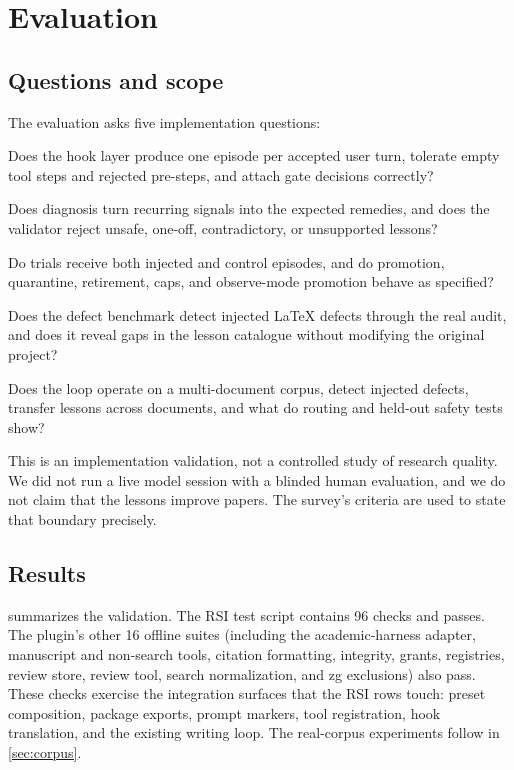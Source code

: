\section{Evaluation}
\label{sec:evaluation}

\subsection{Questions and scope}
\label{sec:questions}
The evaluation asks five implementation questions:
\begin{description}[leftmargin=1.5em,itemsep=2pt]
  \item[RQ1 (capture).] Does the hook layer produce one episode per accepted user turn, tolerate empty tool steps and rejected pre-steps, and attach gate decisions correctly?
  \item[RQ2 (diagnosis and safety).] Does diagnosis turn recurring signals into the expected remedies, and does the validator reject unsafe, one-off, contradictory, or unsupported lessons?
  \item[RQ3 (lifecycle).] Do trials receive both injected and control episodes, and do promotion, quarantine, retirement, caps, and observe-mode promotion behave as specified?
  \item[RQ4 (oracle integration).] Does the defect benchmark detect injected \LaTeX{} defects through the real audit, and does it reveal gaps in the lesson catalogue without modifying the original project?
  \item[RQ5 (real corpus).] Does the loop operate on a multi-document corpus, detect injected defects, transfer lessons across documents, and what do routing and held-out safety tests show?
\end{description}
This is an implementation validation, not a controlled study of research quality. We did not run a live model session with a blinded human evaluation, and we do not claim that the lessons improve papers. The survey's criteria are used to state that boundary precisely.

\subsection{Results}
\label{sec:results}
 summarizes the validation. The RSI test script contains 96 checks and passes. The plugin's other 16 offline suites (including the academic-harness adapter, manuscript and non-search tools, citation formatting, integrity, grants, registries, review store, review tool, search normalization, and zg exclusions) also pass. These checks exercise the integration surfaces that the RSI rows touch: preset composition, package exports, prompt markers, tool registration, hook translation, and the existing writing loop. The real-corpus experiments follow in \cref{sec:corpus}.

